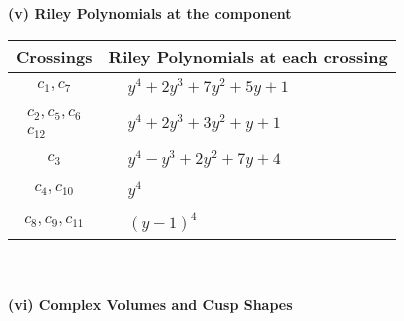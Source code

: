 \documentclass[1p]{elsarticle_modified}
\theoremstyle{definition}
\begin{document}
\newpage\renewcommand{\arraystretch}{1}
\flushleft \textbf{(v) Riley Polynomials at the component}\newline \\
\begin{tabular}{m{50pt}|m{274pt}}
Crossings & \hspace{64pt}Riley Polynomials at each crossing \\
\hline $$\begin{aligned}c_{1},c_{7}\end{aligned}$$&$\begin{aligned}
&y^4+2 y^3+7 y^2+5 y+1
\end{aligned}$\\
\hline $$\begin{aligned}c_{2},c_{5},c_{6}\\c_{12}\end{aligned}$$&$\begin{aligned}
&y^4+2 y^3+3 y^2+y+1
\end{aligned}$\\
\hline $$\begin{aligned}c_{3}\end{aligned}$$&$\begin{aligned}
&y^4- y^3+2 y^2+7 y+4
\end{aligned}$\\
\hline $$\begin{aligned}c_{4},c_{10}\end{aligned}$$&$\begin{aligned}
&y^4
\end{aligned}$\\
\hline $$\begin{aligned}c_{8},c_{9},c_{11}\end{aligned}$$&$\begin{aligned}
&(y-1)^4
\end{aligned}$\\
\hline
\end{tabular}\\~\\
\newpage\flushleft \textbf{(vi) Complex Volumes and Cusp Shapes}
\end{document}
